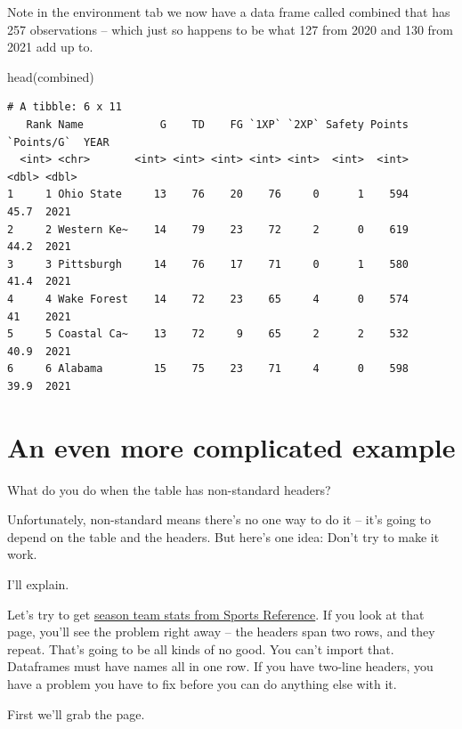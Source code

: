 \documentclass[
  letterpaper,
  DIV=11,
  numbers=noendperiod]{scrreprt}
\newenvironment{Shaded}{\begin{snugshade}}{\end{snugshade}}
\newcommand{\FunctionTok}[1]{\textcolor[rgb]{0.28,0.35,0.67}{#1}}
\newcommand{\NormalTok}[1]{\textcolor[rgb]{0.00,0.23,0.31}{#1}}
\begin{document}
Note in the environment tab we now have a data frame called combined
that has 257 observations -- which just so happens to be what 127 from
2020 and 130 from 2021 add up to.

\begin{Shaded}
\begin{Highlighting}[]
\FunctionTok{head}\NormalTok{(combined)}
\end{Highlighting}
\end{Shaded}

\begin{verbatim}
# A tibble: 6 x 11
   Rank Name            G    TD    FG `1XP` `2XP` Safety Points `Points/G`  YEAR
  <int> <chr>       <int> <int> <int> <int> <int>  <int>  <int>      <dbl> <dbl>
1     1 Ohio State     13    76    20    76     0      1    594       45.7  2021
2     2 Western Ke~    14    79    23    72     2      0    619       44.2  2021
3     3 Pittsburgh     14    76    17    71     0      1    580       41.4  2021
4     4 Wake Forest    14    72    23    65     4      0    574       41    2021
5     5 Coastal Ca~    13    72     9    65     2      2    532       40.9  2021
6     6 Alabama        15    75    23    71     4      0    598       39.9  2021
\end{verbatim}

\hypertarget{an-even-more-complicated-example}{%
\section{An even more complicated
example}\label{an-even-more-complicated-example}}

What do you do when the table has non-standard headers?

Unfortunately, non-standard means there's no one way to do it -- it's
going to depend on the table and the headers. But here's one idea: Don't
try to make it work.

I'll explain.

Let's try to get
\href{https://www.sports-reference.com/cbb/seasons/2020-school-stats.html}{season
team stats from Sports Reference}. If you look at that page, you'll see
the problem right away -- the headers span two rows, and they repeat.
That's going to be all kinds of no good. You can't import that.
Dataframes must have names all in one row. If you have two-line headers,
you have a problem you have to fix before you can do anything else with
it.

First we'll grab the page.
\end{document}
